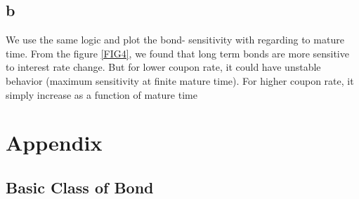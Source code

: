 \documentclass[a4paper,11pt]{article} %
\begin{document}
\subsection{b}
We use the same logic and plot the bond- sensitivity with regarding to mature time. From the figure \ref{FIG4}, we found that long term bonds are more sensitive to interest rate change.  But for lower coupon rate, it could have unstable behavior (maximum sensitivity at finite mature time). For higher coupon rate, it simply increase as a function of mature time\cite{villazon1991bond}\\
\newpage 
\section{Appendix}
\subsection{Basic Class of Bond}
\end{document}
